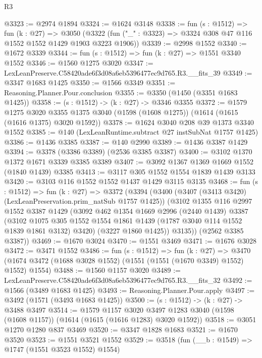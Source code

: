 \begin{lexlean}{R3}
\begin{coremodule}
@3323 := @2974 @1894
@3324 := @1624 @3148
@3338 := fun (s : @1512) =>
  fun (k : @27) =>
  @3050 (@3322 (fun ("_" : @3323) => @3324 @308 @47 @116 @1552 @1552 @1429 @1903 @3223 @1906))
@3339 := @2998 @1552
@3340 := @1672 @3339
@3344 := fun (s : @1512) => fun (k : @27) => @1551 @3340 @1552
@3346 := @1560 @1275 @3020
@3347 := LexLeanPreserve.C58420ade6f3d08a6eb5396477ec9d765.R3.__fits_39
@3349 := @3347 @1683 @1425
@3350 := @1566 @3349
@3351 := Reasoning.Planner.Pour.conclusion
@3355 := @3350 (@1450 (@3351 @1683 @1425))
@3358 := (s : @1512) -> (k : @27) -> @3346 @3355
@3372 := @1579
    @1275
    @3020
    @3355
    @1375
    @3040
    (@1598 (@1608 @1275))
    (@1614 (@1615 (@1616 @1375) @3020 @1592))
@3378 := @1624 @3040 @208 @39 @1373 @3340 @1552
@3385 := @140 (LexLeanRuntime.subtract @27 instSubNat @1757 @1425)
@3386 := @1436 @3385
@3387 := @140 @2990
@3389 := @1436 @3387 @1429
@3394 := @3378 (@3386 @3389) (@2536 @3385 @3387)
@3400 := @3102 @1370 @1372 @1671 @3339 @3385 @3389
@3407 := @3092 @1367 @1369 @1669 @1552 (@1840 @1439) @3385
@3413 := @3117 @305 @1552 @1554 @1839 @1439 @3133
@3420 := @3103 @116 @1552 @1552 @1437 @1429 @3115 @3135
@3468 := fun (s : @1512) =>
  fun (k : @27) =>
  @3372
    (@3394
      (@3400
        (@3407 (@3413 @3420) (LexLeanPreservation.prim_natSub @1757 @1425))
        (@3102
          @1355
          @116
          @2997
          @1552
          @3387
          @1429
          (@3092
            @462
            @1354
            @1669
            @2996
            (@2440 @1439)
            @3387
            (@3102
              @1075
              @305
              @1552
              @1554
              @1861
              @1439
              (@1787 @3040 @114 @1552 @1839 @1861 @3132)
              @3420)
            (@3227 @1860 @1425))
          @3135))
      (@2562 @3385 @3387))
@3469 := @1670 @3024
@3470 := @1551 @3469
@3471 := @1676 @3028
@3472 := @3471 @1552
@3486 := fun (s : @1512) =>
  fun (k : @27) =>
  @3470 (@1674 @3472 (@1688 @3028 @1552) (@1551 (@1551 (@1670 @3349) @1552) @1552) @1554)
@3488 := @1560 @1157 @3020
@3489 := LexLeanPreserve.C58420ade6f3d08a6eb5396477ec9d765.R3.__fits_32
@3492 := @1566 (@3489 @1683 @1425)
@3493 := Reasoning.Planner.Pour.apply
@3497 := @3492 (@1571 (@3493 @1683 @1425))
@3500 := (s : @1512) -> (k : @27) -> @3488 @3497
@3514 := @1579
    @1157
    @3020
    @3497
    @1283
    @3040
    (@1598 (@1608 @1157))
    (@1614 (@1615 (@1616 @1283) @3020 @1592))
@3518 := @3051 @1270 @1280 @837 @3469
@3520 := @3347 @1828 @1683
@3521 := @1670 @3520
@3523 := @1551 @3521 @1552
@3529 := @3518 (fun (__b : @1549) => @1747 (@1551 @3523 @1552) @1554)

\end{coremodule}
\end{lexlean}
